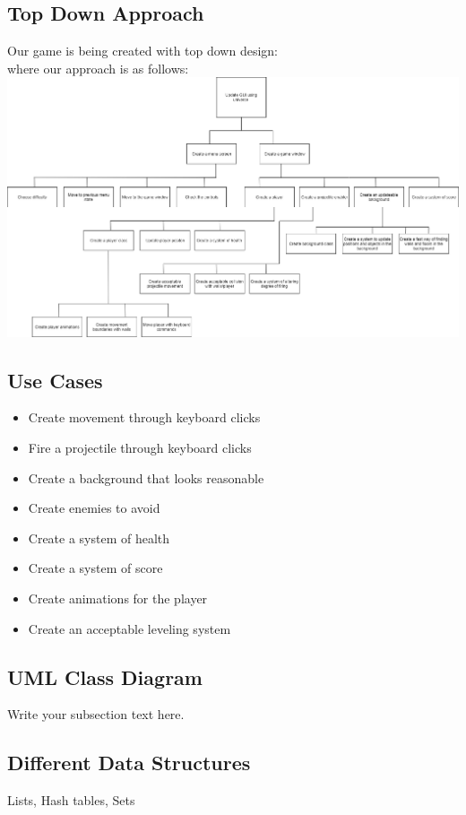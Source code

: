 \documentclass{article}
\begin{document}
	\subsection{Top Down Approach}
	Our game is being created with top down design: \\
	where our approach is as follows: \\
	\includegraphics[scale=0.35]{blah1}
	\subsection{Use Cases}
	\begin{itemize}
		\item Create movement through keyboard clicks
		\item Fire a projectile through keyboard clicks
		\item Create a background that looks reasonable
		\item Create enemies to avoid
		\item Create a system of health
		\item Create a system of score
		\item Create animations for the player
		\item Create an acceptable leveling system
	\end{itemize}
	\subsection{UML Class Diagram}
	Write your subsection text here.
	\subsection{Different Data Structures}
	Lists, Hash tables, Sets
\end{document}
